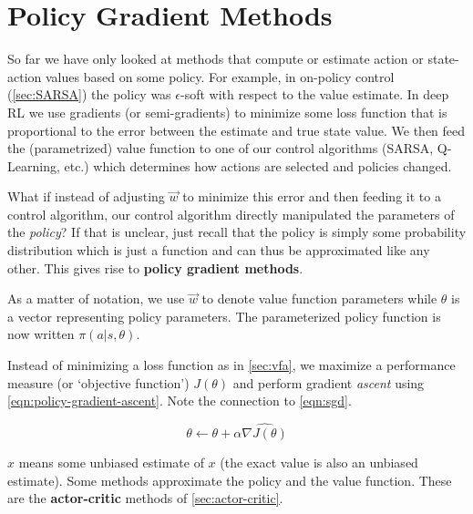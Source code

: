 \documentclass[11pt]{report}
\begin{document}
\section{Policy Gradient Methods}\label{sec:policy-gradient}

So far we have only looked at methods that compute or estimate action or state-action values based on some policy. For example, in on-policy control (\autoref{sec:SARSA}) the policy was $\epsilon$-soft with respect to the value estimate. In deep RL we use gradients (or semi-gradients) to minimize some loss function that is proportional to the error between the estimate and true state value. We then feed the (parametrized) value function to one of our control algorithms (SARSA, Q-Learning, etc.) which determines how actions are selected and policies changed.

What if instead of adjusting $\vec{w}$ to minimize this error and then feeding it to a control algorithm, our control algorithm directly manipulated the parameters of the \textit{policy}? If that is unclear, just recall that the policy is simply some probability distribution which is just a function and can thus be approximated like any other. This gives rise to \textbf{policy gradient methods}.

As a matter of notation, we use $\vec{w}$ to denote value function parameters while $\theta$ is a vector representing policy parameters. The parameterized policy function is now written $\pi(a | s, \theta)$.

Instead of minimizing a loss function as in \autoref{sec:vfa}, we maximize a performance measure (or `objective function') $J(\theta)$ and perform gradient \textit{ascent} using \autoref{eqn:policy-gradient-ascent}. Note the connection to \autoref{eqn:sgd}.

\begin{equation}
	\label{eqn:policy-gradient-ascent}
	\theta \xleftarrow{} \theta + \alpha \widehat{\nabla J(\theta)}
\end{equation}

$\widehat{x}$ means some unbiased estimate of $x$ (the exact value is also an unbiased estimate). Some methods approximate the policy and the value function. These are the \textbf{actor-critic} methods of \autoref{sec:actor-critic}.
\end{document}
